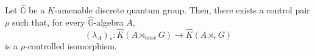 \begin{prop}\label{QGK}
Let $\hat{\mathbb G}$ be a $K$-amenable discrete quantum group. Then, there exists a control pair $\rho$ such that, for every $\hat{\mathbb G}$-algebra $A$,
\[(\lambda_A)_* : \hat K(A\rtimes_{max} G) \rightarrow \hat K(A\rtimes_r G) \]
is a $\rho$-controlled isomorphism.
\end{prop}





























   
